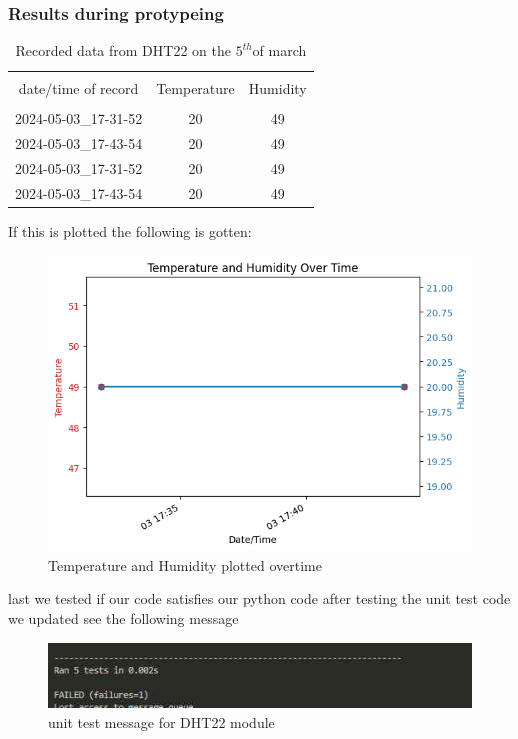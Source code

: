 \subsubsection{Results during protypeing}
\begin{table}[h!]
    \centering
    \begin{tabular}{|c|c|c|}
        \hline\\
        date/time of record & Temperature &Humidity \\
        \hline\hline\\
        2024-05-03_17-31-52&20&49\\
        2024-05-03_17-43-54&20&49\\
        2024-05-03_17-31-52&20&49\\
        2024-05-03_17-43-54&20&49
        \hline
    \end{tabular}
    \caption{Recorded data from  DHT22 on the $5^{th}$of march}
    \label{Recorded data from  DHT22 on the 5th of march}
\end{table}
If this is  plotted the following is gotten:
\begin{figure}[h!]
    \centering
    \includegraphics[width=0.5\linewidth]{Images/temp_and_humidity_over_time.png}
    \caption{Temperature and Humidity plotted overtime}
    \label{Temperature and Humidity plotted overtime}
\end{figure} 
last we tested if our code  satisfies our  python code after testing the unit test code we updated see the following message
\begin{figure}[h!]
    \centering
    \includegraphics[width=0.5\linewidth]{Images/unit_testoutput.jpg}
    \caption{unit test message for DHT22 module}
    \label{unit test message for DHT22 module}
\end{figure}
\newpage
